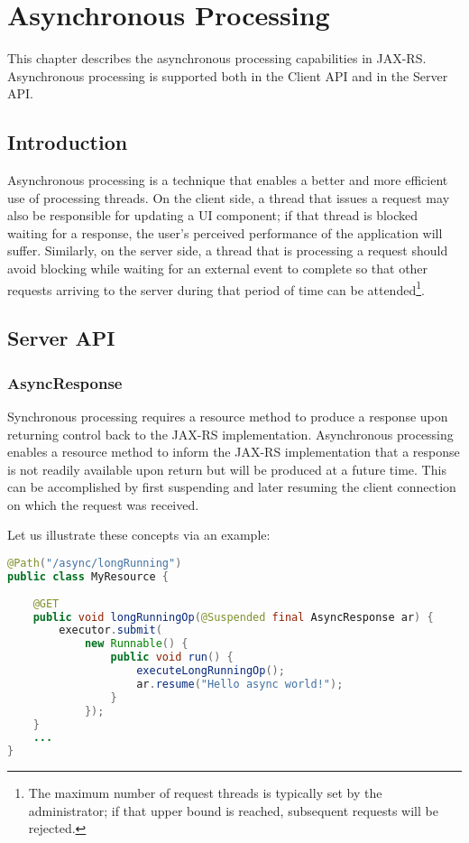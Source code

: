 \chapter{Asynchronous Processing}
\label{asynchronous_processing}

This chapter describes the asynchronous processing capabilities in JAX-RS. Asynchronous processing is supported both in
the Client API and in the Server API.

\section{Introduction}
\label{introduction_async}

Asynchronous processing is a technique that enables a better and more efficient use of processing threads. On the client
side, a thread that issues a request may also be responsible for updating a UI component; if that thread is blocked
waiting for a response, the user's perceived performance of the application will suffer. Similarly, on the server side,
a thread that is processing a request should avoid blocking while waiting for an external event to complete so that
other requests arriving to the server during that period of time can be attended\footnote{The maximum number of request
threads is typically set by the administrator; if that upper bound is reached, subsequent requests will be rejected.}.

\section{Server API}
\label{server_api}

\subsection{AsyncResponse}
\label{async_response}

Synchronous processing requires a resource method to produce a response upon returning control back to the JAX-RS
implementation. Asynchronous processing enables a resource method to inform the JAX-RS implementation that a response is
not readily available upon return but will be produced at a future time. This can be accomplished by first suspending
and later resuming the client connection on which the request was received.

Let us illustrate these concepts via an example:

\begin{lstlisting}[language=Java]
@Path("/async/longRunning")
public class MyResource {
    
    @GET
    public void longRunningOp(@Suspended final AsyncResponse ar) {
        executor.submit(
            new Runnable() {
                public void run() {
                    executeLongRunningOp();
                    ar.resume("Hello async world!");
                } 
            });
    } 
    ...
}
\end{lstlisting}

